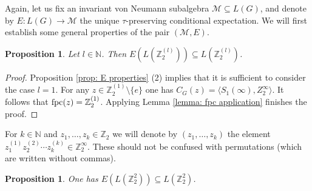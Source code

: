 \documentclass[11pt]{amsart}
\newcommand{\N}{\mathbb N}
\newcommand{\fpc}{{\rm fpc}}
\theoremstyle{plain}
\newtheorem{proposition}[theorem]{Proposition}
\theoremstyle{definition}
\theoremstyle{remark}
\numberwithin{equation}{section}
\begin{document}
Again, let us fix an invariant von Neumann subalgebra $\mathcal{M}\subseteq L(G)$, and denote by $E:L(G) \to \mathcal{M}$ the unique $\tau$-preserving conditional expectation. We will first establish some general properties of the pair $(\mathcal M, E)$.
\begin{proposition}
Let $l \in \N$. Then $E(L(\mathbb Z_2^{(l)}))\subseteq L(\mathbb Z_2^{(l)})$.
\end{proposition}
\begin{proof}
	Proposition \ref{prop: E properties} (2) implies that it is sufficient to consider the case $l=1$. For any $z\in \mathbb Z_2^{(1)}\setminus \{e\}$ one has $C_G(z)=\langle S_1(\infty),Z_2^\infty\rangle$. It follows that $\fpc(z)=\mathbb Z_2^{(1)}$. Applying Lemma \ref{lemma: fpc application} finishes the proof.
\end{proof}
For $k \in \N$ and $z_1,\ldots, z_k\in \mathbb Z_2$ we will denote by $(z_1,\ldots,z_k)$ the element $z_1^{(1)}z_2^{(2)}\cdots z_k^{(k)}\in\mathbb Z_2^\infty$. These should not be confused with permutations (which are written without commas).
\begin{proposition}\label{prop:E(L(Z_m^2))}
	One has $E(L(\mathbb Z_2^2))\subseteq L(\mathbb Z_2^2)$.
\end{proposition}
\end{document}
